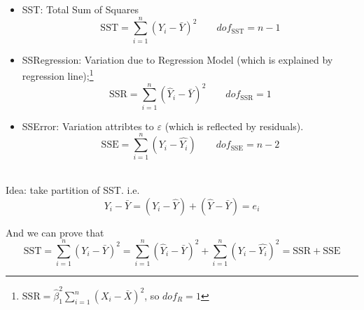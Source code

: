 \begin{itemize}[topsep=2pt,itemsep=2pt]
    \item SST: Total Sum of Squares
    \begin{equation}
        \mathrm{SST}=\sum_{i=1}^n(Y_i-\bar{Y})^2 \qquad dof_{\mathrm{SST}}=n-1
    \end{equation}
    \item SSRegression: Variation due to Regression Model (which is explained by regression line);\footnote{$ \mathrm{SSR}=\hat{\beta }_1^2\sum_{i=1}^n(X_i-\bar{X})^2$, so $ dof_R=1 $}
    \begin{equation}
        \mathrm{SSR}= \sum_{i=1}^n(\hat{Y}_i-\bar{Y})^2 \qquad dof_{\mathrm{SSR}}=1
    \end{equation}
    
    \item SSError: Variation attribtes to $ \varepsilon  $  (which is reflected by residuals).
    \begin{equation}
        \mathrm{SSE}= \sum_{i=1}^n(Y_i-\hat{Y_i}) \qquad dof_{\mathrm{SSE}}=n-2
    \end{equation}
\end{itemize}

\\



    Idea: take partition of SST. i.e.
    \begin{equation}
        Y_i-\bar{Y}=(Y_i-\hat{Y})+(\hat{Y}-\bar{Y})=e_i 
    \end{equation}
    
    And we can prove that
    \begin{equation}
        \mathrm{SST}=\sum_{i=1}^n(Y_i-\bar{Y})^2=\sum_{i=1}^n(\hat{Y}_i-\bar{Y})^2+\sum_{i=1}^n(Y_i-\hat{Y_i})^2=\mathrm{SSR+SSE} 
    \end{equation}

